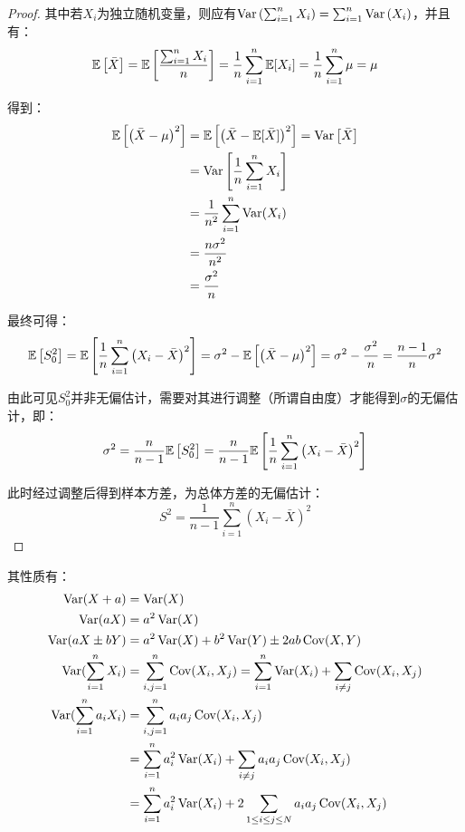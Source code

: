 \documentclass[11pt]{article}
\begin{document}
\begin{proof}
    其中若$X_i$为独立随机变量，则应有$\operatorname{Var}\left( \sum_{i=1}^{n} X_i \right) = \sum_{i=1}^{n} \operatorname{Var} \left( X_i \right)$，并且有：
    \begin{equation*}
        \mathbb{E}\left[\bar{X}\right] 
        = \mathbb{E}\left[\frac{\sum_{i=1}^{n} X_i}{n}\right]
        = \frac{1}{n} \sum_{i=1}^{n} \mathbb{E}[X_i]
        = \frac{1}{n} \sum_{i=1}^{n} \mu
        = \mu
    \end{equation*}
    
    得到：
    \begin{align*}
        \mathbb{E}\left[\left( \bar{X} - \mu \right)^2 \right]
        &= \mathbb{E}\left[\left( \bar{X} - \mathbb{E}[\bar{X}] \right)^2 \right]
        = \operatorname{Var}\left[ \bar{X} \right] \\
        &= \operatorname{Var}\left[ \frac{1}{n} \sum_{i=1}^{n} X_i \right] \\
        &= \frac{1}{n^2} \sum_{i=1}^{n} \operatorname{Var}(X_i) \\
        &= \frac{n \sigma^2}{n^2} \\
        &= \frac{\sigma^2}{n}
    \end{align*}

    最终可得：
    \begin{equation*}
        \mathbb{E}\left[S_0^2\right] 
        = \mathbb{E} \left[\frac{1}{n} \sum_{i=1}^{n} \left( X_i - \bar{X} \right)^2 \right]
        = \sigma^2 - \mathbb{E}\left[\left( \bar{X} - \mu \right)^2 \right]
        = \sigma^2 - \frac{\sigma^2}{n}
        = \frac{n-1}{n} \sigma^2
    \end{equation*}

    由此可见$S_0^2$并非无偏估计，需要对其进行调整（所谓自由度）才能得到$\sigma$的无偏估计，即：
    \begin{equation*}
        \sigma^2
        = \frac{n}{n-1} \mathbb{E}\left[S_0^2\right]
        = \frac{n}{n-1} \mathbb{E} \left[\frac{1}{n} \sum_{i=1}^{n} \left( X_i - \bar{X} \right)^2 \right]
    \end{equation*}

    此时经过调整后得到样本方差，为总体方差的无偏估计：
    \begin{equation*}
        S^2 = \frac{1}{n-1} \sum_{i=1}^{n} \left(X_i - \bar{X} \right)^2
    \end{equation*}
\end{proof}

其性质有：
\begin{align*}
    \operatorname{Var}(X + a) &= \operatorname{Var}(X) \\
    \operatorname{Var}(aX) &= a^2\operatorname{Var}(X) \\
    \operatorname{Var}(aX \pm bY) &= a^2\operatorname{Var}(X) + b^2\operatorname{Var}(Y) \pm 2ab \operatorname{Cov}(X,Y) \\
    \operatorname{Var}(\sum_{i=1}^{n} X_i) &= \sum_{i,j=1}^{n}\operatorname{Cov}(X_i,X_j) = \sum_{i=1}^{n}\operatorname{Var}(X_i) + \sum_{i \neq j}\operatorname{Cov}(X_i,X_j) \\
    \operatorname{Var}(\sum_{i=1}^{n} a_i X_i) &= \sum_{i,j=1}^{n}a_i a_j\operatorname{Cov}(X_i,X_j) \\
    &= \sum_{i=1}^{n}a_i^2\operatorname{Var}(X_i) + \sum_{i \neq j} a_i a_j \operatorname{Cov}(X_i,X_j) \\
    &= \sum_{i=1}^{n}a_i^2\operatorname{Var}(X_i) + 2\sum_{1 \leq i \leq j \leq N} a_i a_j \operatorname{Cov}(X_i,X_j)
\end{align*}
\end{document}
